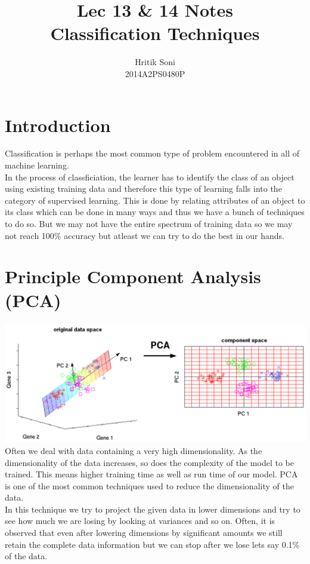 \documentclass[11pt]{article}
\begin{document}
\title{Lec 13 \& 14 Notes \\ Classification Techniques}
\author{Hritik Soni \\ 2014A2PS0480P}
\date{}
\maketitle
\clearpage
\section{Introduction}
Classification is perhaps the most common type of problem encountered in all of machine learning.\\

In the process of classficiation, the learner has to identify the class of an object using existing training data and therefore this type of learning falls into the category of supervised learning. This is done by relating attributes of an object to its class which can be done in many ways and thus we have a bunch of techniques to do so. But we may not have the entire spectrum of training data so we may not reach 100\% accuracy but atleast we can try to do the best in our hands.
\section{Principle Component Analysis (PCA)}
\includegraphics[width=\textwidth]{pca.png}
Often we deal with data containing a very high dimensionality. As the dimensionality of the data increases, so does the complexity of the model to be trained. This means higher training time as well as run time of our model. PCA is one of the most common techniques used to reduce the dimensionality of the data.\\

In this technique we try to project the given data in lower dimensions and try to see how much we are losing by looking at variances and so on. Often, it is observed that even after lowering dimensions by significant amounts we still retain the complete data information but we can stop after we lose lets say 0.1\% of the data.
\end{document}
